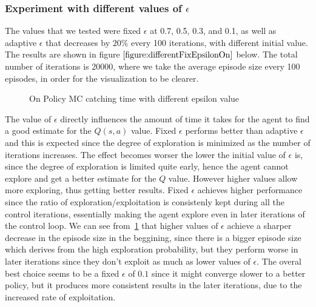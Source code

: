 \documentclass[paper=a4, fontsize=11pt]{scrartcl}
\numberwithin{equation}{section}		%
\numberwithin{figure}{section}			%
\numberwithin{table}{section}				%
\begin{document}
\subsubsection*{Experiment with different values of $\epsilon$}
The values that we tested were fixed $\epsilon$ at 0.7, 0.5, 0.3, and 0.1, as well as adaptive $\epsilon$ that decreases by $20\%$ every 100 iterations, with different initial value. The results are shown in figure $\ref{figure:differentFixEpsilonOn}$ below. The total number of iterations is  20000, where we take the average episode size every 100 episodes, in order for the visualization to be clearer. 
\begin{figure}[h] \centering
\caption{On Policy MC catching time with different epsilon value} \label{figure:differentFixEpsilonOn}
\end{figure}

The value of $\epsilon$ directly influences the amount of time it takes for the agent to find a good estimate for the $Q(s,a)$ value. Fixed $\epsilon$ performs better than adaptive $\epsilon$ and this is expected since the degree of exploration is minimized as the number of iterations increases. The effect becomes worser the lower the initial value of $\epsilon$ is, since the degree of exploration is limited quite early, hence the agent cannot explore and get a better estimate for the $Q$ value. However higher values allow more exploring, thus getting better results. Fixed $\epsilon$ achieves higher performance since the ratio of exploration/exploitation is consistenly kept during all the control iterations, essentially making the agent explore even in later iterations of the control loop.  We can see from~\ref{figure:differentFixEpsilonOn} that higher  values of $\epsilon$ achieve a sharper decrease in the episode size in the beggining, since there is a bigger episode size which derives from the high exploration probability, but they perform worse in later iterations since they don't exploit as much as lower values of $\epsilon$. The overal best choice seems to be a fixed $\epsilon$ of $0.1$ since it might converge slower to a better policy, but it produces more consistent results in the later iterations, due to the increased rate of exploitation. 
\end{document}
